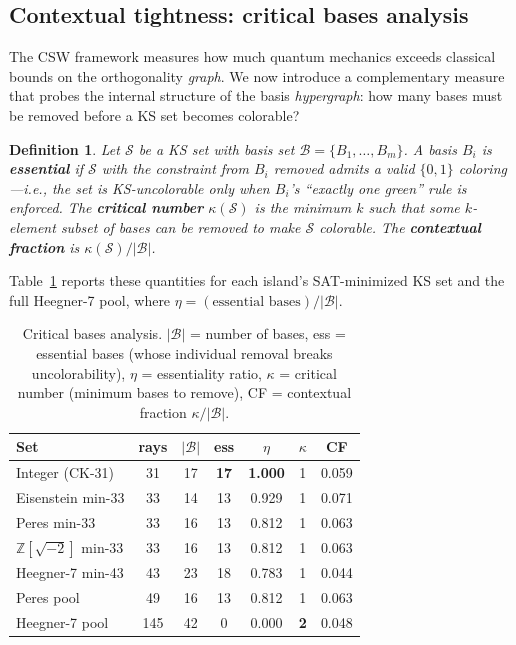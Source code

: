 \documentclass[12pt,a4paper]{article}
\newtheorem{definition}[theorem]{Definition}
\newcommand{\Z}{\mathbb{Z}}
\begin{document}
\subsection{Contextual tightness: critical bases analysis}\label{sec:critical-bases}

The CSW framework measures how much quantum mechanics exceeds classical bounds on the orthogonality \emph{graph}. We now introduce a complementary measure that probes the internal structure of the basis \emph{hypergraph}: how many bases must be removed before a KS set becomes colorable?

\begin{definition}\label{def:essential-basis}
Let $\mathcal{S}$ be a KS set with basis set $\mathcal{B} = \{B_1, \ldots, B_m\}$. A basis $B_i$ is \textbf{essential} if $\mathcal{S}$ with the constraint from $B_i$ removed admits a valid $\{0,1\}$ coloring---i.e., the set is KS-uncolorable only when $B_i$'s ``exactly one green'' rule is enforced. The \textbf{critical number} $\kappa(\mathcal{S})$ is the minimum $k$ such that some $k$-element subset of bases can be removed to make $\mathcal{S}$ colorable. The \textbf{contextual fraction} is $\kappa(\mathcal{S}) / |\mathcal{B}|$.
\end{definition}

Table~\ref{tab:critical-bases} reports these quantities for each island's SAT-minimized KS set and the full Heegner-7 pool, where $\eta = (\text{essential bases}) / |\mathcal{B}|$.

\begin{table}[ht]
\centering
\caption{Critical bases analysis. $|\mathcal{B}|$ = number of bases, ess = essential bases (whose individual removal breaks uncolorability), $\eta$ = essentiality ratio, $\kappa$ = critical number (minimum bases to remove), CF = contextual fraction $\kappa/|\mathcal{B}|$.}
\label{tab:critical-bases}
\begin{tabular}{lcccccc}
\toprule
Set & rays & $|\mathcal{B}|$ & ess & $\eta$ & $\kappa$ & CF \\
\midrule
Integer (CK-31) & 31 & 17 & \textbf{17} & \textbf{1.000} & 1 & 0.059 \\
Eisenstein min-33 & 33 & 14 & 13 & 0.929 & 1 & 0.071 \\
Peres min-33 & 33 & 16 & 13 & 0.812 & 1 & 0.063 \\
$\Z[\sqrt{-2}]$ min-33 & 33 & 16 & 13 & 0.812 & 1 & 0.063 \\
Heegner-7 min-43 & 43 & 23 & 18 & 0.783 & 1 & 0.044 \\
\midrule
Peres pool & 49 & 16 & 13 & 0.812 & 1 & 0.063 \\
Heegner-7 pool & 145 & 42 & 0 & 0.000 & \textbf{2} & 0.048 \\
\bottomrule
\end{tabular}
\end{table}
\end{document}

